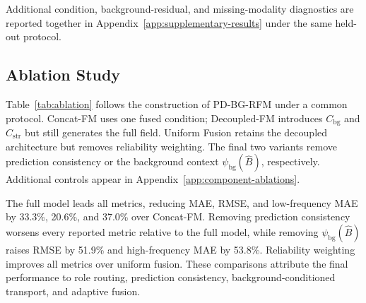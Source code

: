 \documentclass[letterpaper]{article}
\begin{document}
Additional condition, background-residual, and missing-modality diagnostics are reported together in Appendix~\ref{app:supplementary-results} under the same held-out protocol.

\subsection{Ablation Study}

Table~\ref{tab:ablation} follows the construction of PD-BG-RFM under a common protocol. Concat-FM uses one fused condition; Decoupled-FM introduces $C_{\mathrm{bg}}$ and $C_{\mathrm{str}}$ but still generates the full field. Uniform Fusion retains the decoupled architecture but removes reliability weighting. The final two variants remove prediction consistency or the background context $\psi_{\mathrm{bg}}(\hat B)$, respectively. Additional controls appear in Appendix~\ref{app:component-ablations}.


The full model leads all metrics, reducing MAE, RMSE, and low-frequency MAE by 33.3\%, 20.6\%, and 37.0\% over Concat-FM. Removing prediction consistency worsens every reported metric relative to the full model, while removing $\psi_{\mathrm{bg}}(\hat B)$ raises RMSE by 51.9\% and high-frequency MAE by 53.8\%. Reliability weighting improves all metrics over uniform fusion. These comparisons attribute the final performance to role routing, prediction consistency, background-conditioned transport, and adaptive fusion.
\end{document}
